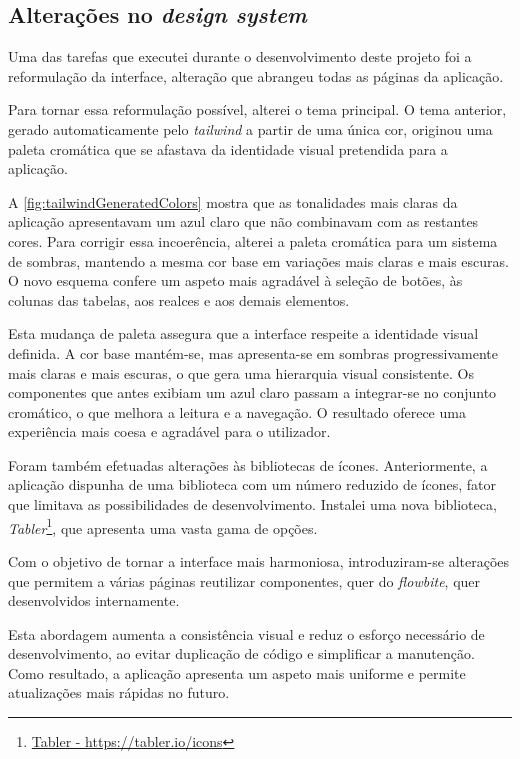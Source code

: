 \clearpage 
\subsection{Alterações no \textit{design system}} %
Uma das tarefas que executei durante o desenvolvimento deste projeto foi a reformulação da interface, alteração que abrangeu todas as páginas da aplicação.

Para tornar essa reformulação possível, alterei o tema principal. O tema anterior, gerado automaticamente pelo \textit{tailwind} a partir de uma única cor, originou uma paleta cromática que se afastava da identidade visual pretendida para a aplicação.

A \autoref{fig:tailwindGeneratedColors} mostra que as tonalidades mais claras da aplicação apresentavam um azul claro que não combinavam com as restantes cores. Para corrigir essa incoerência, alterei a paleta cromática para um sistema de sombras, mantendo a mesma cor base em variações mais claras e mais escuras. O novo esquema confere um aspeto mais agradável à seleção de botões, às colunas das tabelas, aos realces e aos demais elementos.

Esta mudança de paleta assegura que a interface respeite a identidade visual definida. A cor base mantém-se, mas apresenta-se em sombras progressivamente mais claras e mais escuras, o que gera uma hierarquia visual consistente. Os componentes que antes exibiam um azul claro passam a integrar-se no conjunto cromático, o que melhora a leitura e a navegação. O resultado oferece uma experiência mais coesa e agradável para o utilizador.

Foram também efetuadas alterações às bibliotecas de ícones. Anteriormente, a aplicação dispunha de uma biblioteca com um número reduzido de ícones, fator que limitava as possibilidades de desenvolvimento. Instalei uma nova biblioteca, \textit{Tabler}\footnote{\href{https://tabler.io/icons}{Tabler - https://tabler.io/icons}}, que apresenta uma vasta gama de opções.

Com o objetivo de tornar a interface mais harmoniosa, introduziram-se alterações que permitem a várias páginas reutilizar componentes, quer do \textit{flowbite}, quer desenvolvidos internamente.

Esta abordagem aumenta a consistência visual e reduz o esforço necessário de desenvolvimento, ao evitar duplicação de código e simplificar a manutenção. Como resultado, a aplicação apresenta um aspeto mais uniforme e permite atualizações mais rápidas no futuro.

